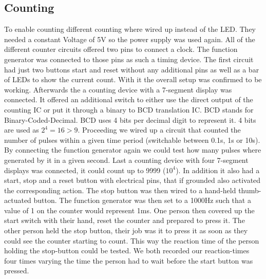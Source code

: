\documentclass[fleqn,11pt]{article}
\begin{document}
\subsection{Counting}
To enable counting different counting where wired up instead of the LED. They needed a constant Voltage
of 5V so the power supply was used again. All of the different counter circuits offered two pins to connect
a clock. The function generator was connected to those pins as such a timing device. The first circuit had
just two buttons start and reset without any additional pins as well as a bar of LEDs to show the current
count. With it the overall setup was confirmed to be working. 
\newline
\newline
Afterwards the a counting device with a
7-segment display was connected. It offered an additional switch to either use the direct output
of the counting IC or put it through a binary to BCD translation IC. BCD stands for  Binary-Coded-Decimal.
BCD uses 4 bits per decimal digit to represent it. 4 bits are used as $2^4=16 > 9$. 
\newline
\newline
Proceeding we wired up a circuit that counted the number of pulses within a given time period (switchable between
0.1s, 1s or 10s). By connecting the function generator again we could test how many pulses where generated by
it in a given second.
\newline
\newline
Last a counting device with four 7-segment displays was connected, it could count up to 9999 ($10^4$). In
addition it also had a start, stop and a reset button with electrical pins, that if grounded also activated
the corresponding action. The stop button was then wired to a hand-held thumb-actuated button. The function
generator was then set to a 1000Hz such that a value of 1 on the counter would represent 1ms. One person then
covered up the start switch with their hand, reset the counter and prepared to press it. The other person
held the stop button, their job was it to press it as soon as they could see the counter starting to count.
This way the reaction time of the person holding the stop-button could be tested. We both recorded our
reaction-times four times varying the time the person had to wait before the start button was pressed.
\end{document}
